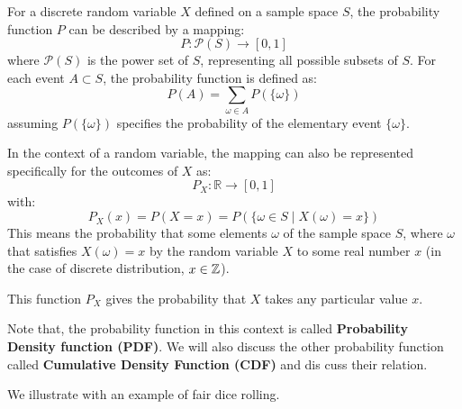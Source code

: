 \begin{definition}
    For a discrete random variable \( X \) defined on a sample space \( S \), the probability function \( P \) can be described by a mapping:
    \[
    P: \mathcal{P}(S) \to [0, 1]
    \]
    where \( \mathcal{P}(S) \) is the power set of \( S \), representing all possible subsets of \( S \). For each event \( A \subset S \), the probability function is defined as:
    \[
    P(A) = \sum_{\omega \in A} P(\{\omega\})
    \]
    assuming \( P(\{\omega\}) \) specifies the probability of the elementary event \( \{\omega\} \).
    
    In the context of a random variable, the mapping can also be represented specifically for the outcomes of \( X \) as:
    \[
    P_X: \mathbb{R} \to [0, 1]
    \]
    with:
    \[
    P_X(x) = P(X = x) = P(\{\omega \in S \mid X(\omega) = x\})
    \]
    This means the probability that some elements $\omega$ of the sample space $S$, where $\omega$ that satisfies $X(\omega)=x$ by the random variable $X$ to some real number $x$ (in the case of discrete distribution, $x\in \mathbb{Z}$).
    
    This function \( P_X \) gives the probability that \( X \) takes any particular value \( x \).    
\end{definition}
\begin{remark}
    Note that, the probability function in this context is called \textbf{Probability Density function (PDF)}. We will also discuss the other probability function called \textbf{Cumulative Density Function (CDF)} and dis cuss their relation.
\end{remark}
We illustrate with an example of fair dice rolling.
